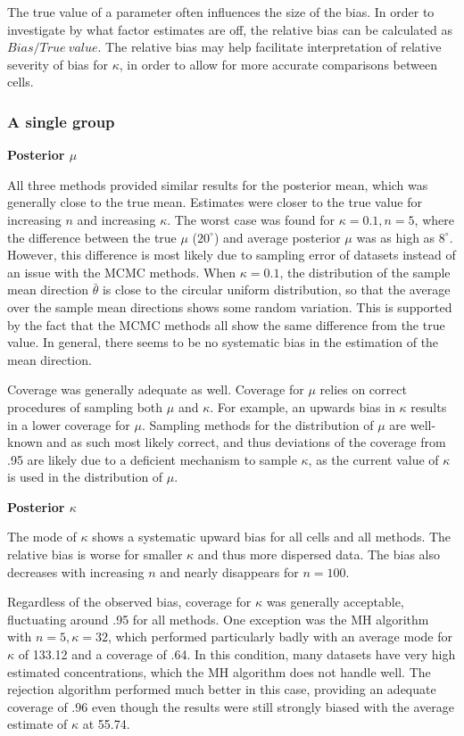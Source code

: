 \documentclass[]{gSCS2e}
\theoremstyle{plain}
\theoremstyle{definition}
\theoremstyle{remark}
\begin{document}
The true value of a parameter often influences the size of the bias. In order to investigate by what factor estimates are off, the relative bias can be calculated as $Bias/True~value$. The relative bias may help facilitate interpretation of relative severity of bias for $\kappa$, in order to allow for more accurate comparisons between cells. 

\subsubsection{A single group}
\noindent \textbf{Posterior $\mu$}

All three methods provided similar results for the posterior mean, which was generally close to the true mean. Estimates were closer to the true value for increasing $n$ and increasing $\kappa$. The worst case was found for $\kappa=0.1, n=5$, where the difference between the true $\mu$ ($20^\circ$) and average posterior $\mu$ was as high as $8^\circ$. However, this difference is most likely due to sampling error of datasets instead of an issue with the MCMC methods. When $\kappa=0.1$, the distribution of the sample mean direction $\bar{\theta}$ is close to the circular uniform distribution, so that the average over the sample mean directions shows some random variation. This is supported by the fact that the MCMC methods all show the same difference from the true value. In general, there seems to be no systematic bias in the estimation of the mean direction. 

Coverage was generally adequate as well. Coverage for $\mu$ relies on correct procedures of sampling both $\mu$ and $\kappa$. For example, an upwards bias in $\kappa$ results in a lower coverage for $\mu$. Sampling methods for the distribution of $\mu$ are well-known and as such most likely correct, and thus deviations of the coverage from .95 are likely due to a deficient mechanism to sample $\kappa$, as the current value of $\kappa$ is used in the distribution of $\mu$.



\vspace{0.3cm}
\noindent \textbf{Posterior $\kappa$}

The mode of $\kappa$ shows a systematic upward bias for all cells and all methods. The relative bias is worse for smaller $\kappa$ and thus more dispersed data. The bias also decreases with increasing $n$ and nearly disappears for $n = 100$. 

Regardless of the observed bias, coverage for $\kappa$ was generally acceptable, fluctuating around .95 for all methods. One exception was the MH algorithm with $n=5, \kappa=32$, which performed particularly badly with an average mode for $\kappa$ of 133.12 and a coverage of .64. In this condition, many datasets have very high estimated concentrations, which the MH algorithm does not handle well. The rejection algorithm performed much better in this case, providing an adequate coverage of .96 even though the results were still strongly biased with the average estimate of $\kappa$ at 55.74. 
\end{document}
